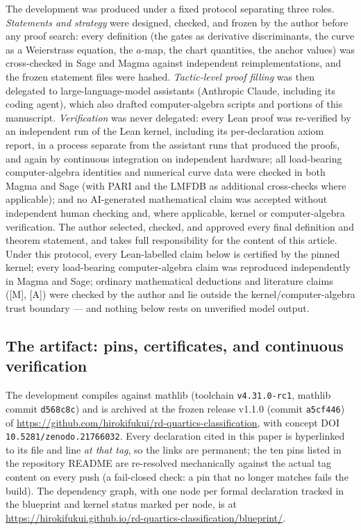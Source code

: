 \documentclass[11pt]{amsart}
\newcommand{\repourl}{https://github.com/hirokifukui/rd-quartics-classification}
\newcommand{\repotag}{v1.1.0}
\newcommand{\repocommit}{a5cf446}
\newcommand{\conceptdoi}{10.5281/zenodo.21766032}
\newcommand{\blueprinturl}{https://hirokifukui.github.io/rd-quartics-classification/blueprint/}
\begin{document}
The development was produced under a fixed protocol separating three
roles.  \emph{Statements and strategy} were designed, checked, and
frozen by the author before any proof search: every definition (the
gates as derivative discriminants, the curve as a Weierstrass equation,
the $a$-map, the chart quantities, the anchor values) was cross-checked
in Sage and Magma against independent reimplementations, and the frozen
statement files were hashed.  \emph{Tactic-level proof filling} was
then delegated to large-language-model assistants (Anthropic Claude,
including its coding agent), which also drafted computer-algebra
scripts and portions of this manuscript.  \emph{Verification} was never
delegated: every Lean proof was re-verified by an independent run of
the Lean kernel, including its per-declaration axiom report, in a
process separate from the assistant runs that produced the proofs, and
again by continuous integration on independent hardware; all load-bearing
computer-algebra identities and numerical curve data were checked in
both Magma and Sage (with PARI and the LMFDB as additional cross-checks
where applicable); and no AI-generated mathematical claim was accepted
without independent human checking and, where applicable, kernel or
computer-algebra verification.  The author selected, checked, and
approved every final definition and theorem statement, and takes full
responsibility for the content of this article.  Under this protocol,
every Lean-labelled claim below is certified by the pinned kernel;
every load-bearing computer-algebra claim was reproduced independently
in Magma and Sage; ordinary mathematical deductions and literature
claims ([M], [A]) were checked by the author and lie outside the
kernel/computer-algebra trust boundary --- and nothing below rests on
unverified model output.

\subsection{The artifact: pins, certificates, and continuous
verification}\label{sec:formal:artifact}

The development compiles against mathlib (toolchain
\texttt{v4.31.0-rc1}, mathlib commit \texttt{d568c8c}) and is archived
at the frozen release \repotag{} (commit \texttt{\repocommit}) of
\url{\repourl}, with concept DOI \texttt{\conceptdoi}.  Every
declaration cited in this paper is hyperlinked to its file and line
\emph{at that tag}, so the links are permanent; the ten pins listed in
the repository README are re-resolved mechanically against the actual
tag content on every push (a fail-closed check: a pin that no longer
matches fails the build).  The dependency graph, with one node per formal declaration tracked in
the blueprint and kernel status marked per node, is at
\url{\blueprinturl}.
\end{document}
